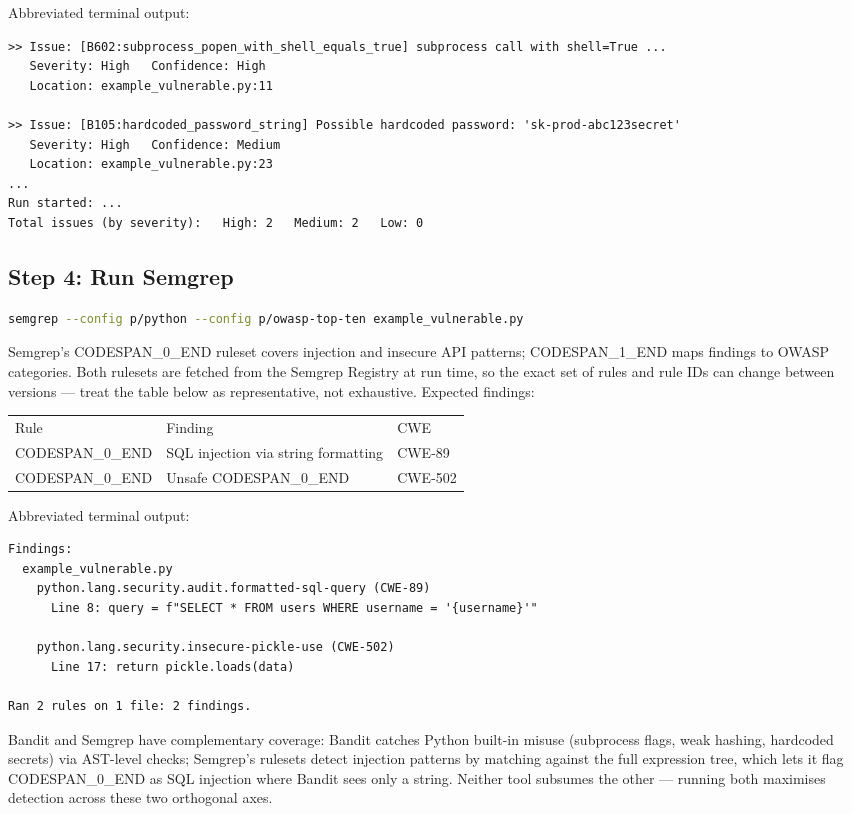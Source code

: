 \documentclass[11pt,a4paper]{book}
\begin{document}
Abbreviated terminal output:

\begin{lstlisting}
>> Issue: [B602:subprocess_popen_with_shell_equals_true] subprocess call with shell=True ...
   Severity: High   Confidence: High
   Location: example_vulnerable.py:11

>> Issue: [B105:hardcoded_password_string] Possible hardcoded password: 'sk-prod-abc123secret'
   Severity: High   Confidence: Medium
   Location: example_vulnerable.py:23
...
Run started: ...
Total issues (by severity):   High: 2   Medium: 2   Low: 0
\end{lstlisting}

\subsection{Step 4: Run Semgrep}

\begin{lstlisting}[language=Bash]
semgrep --config p/python --config p/owasp-top-ten example_vulnerable.py
\end{lstlisting}

Semgrep's CODESPAN\_0\_END ruleset covers injection and insecure API patterns; CODESPAN\_1\_END maps findings to OWASP categories. Both rulesets are fetched from the Semgrep Registry at run time, so the exact set of rules and rule IDs can change between versions --- treat the table below as representative, not exhaustive. Expected findings:

\begin{tabular}{lll}
\hline
Rule & Finding & CWE \\
CODESPAN\_0\_END & SQL injection via string formatting & CWE-89 \\
CODESPAN\_0\_END & Unsafe CODESPAN\_0\_END & CWE-502 \\
\hline
\end{tabular}

Abbreviated terminal output:

\begin{lstlisting}
Findings:
  example_vulnerable.py
    python.lang.security.audit.formatted-sql-query (CWE-89)
      Line 8: query = f"SELECT * FROM users WHERE username = '{username}'"

    python.lang.security.insecure-pickle-use (CWE-502)
      Line 17: return pickle.loads(data)

Ran 2 rules on 1 file: 2 findings.
\end{lstlisting}

Bandit and Semgrep have complementary coverage: Bandit catches Python built-in misuse (subprocess flags, weak hashing, hardcoded secrets) via AST-level checks; Semgrep's rulesets detect injection patterns by matching against the full expression tree, which lets it flag CODESPAN\_0\_END as SQL injection where Bandit sees only a string. Neither tool subsumes the other --- running both maximises detection across these two orthogonal axes.
\end{document}
